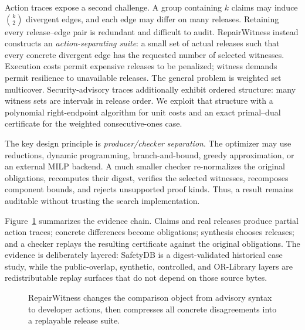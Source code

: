 \documentclass[10pt,conference]{IEEEtran}
\begin{document}
Action traces expose a second challenge. A group containing $k$ claims may induce $\binom{k}{2}$ divergent edges, and each edge may differ on many releases. Retaining every release--edge pair is redundant and difficult to audit. RepairWitness instead constructs an \emph{action-separating suite}: a small set of actual releases such that every concrete divergent edge has the requested number of selected witnesses. Execution costs permit expensive releases to be penalized; witness demands permit resilience to unavailable releases. The general problem is weighted set multicover. Security-advisory traces additionally exhibit ordered structure: many witness sets are intervals in release order. We exploit that structure with a polynomial right-endpoint algorithm for unit costs and an exact primal--dual certificate for the weighted consecutive-ones case.

The key design principle is \emph{producer/checker separation}. The optimizer may use reductions, dynamic programming, branch-and-bound, greedy approximation, or an external MILP backend. A much smaller checker re-normalizes the original obligations, recomputes their digest, verifies the selected witnesses, recomposes component bounds, and rejects unsupported proof kinds. Thus, a result remains auditable without trusting the search implementation.

Figure~\ref{fig:pipeline} summarizes the evidence chain. Claims and real releases produce partial action traces; concrete differences become obligations; synthesis chooses releases; and a checker replays the resulting certificate against the original obligations. The evidence is deliberately layered: SafetyDB is a digest-validated historical case study, while the public-overlap, synthetic, controlled, and OR-Library layers are redistributable replay surfaces that do not depend on those source bytes.

\begin{figure}[t]
\centering
{}
\caption{RepairWitness changes the comparison object from advisory syntax to developer actions, then compresses all concrete disagreements into a replayable release suite.}
\label{fig:pipeline}
\end{figure}
\end{document}
